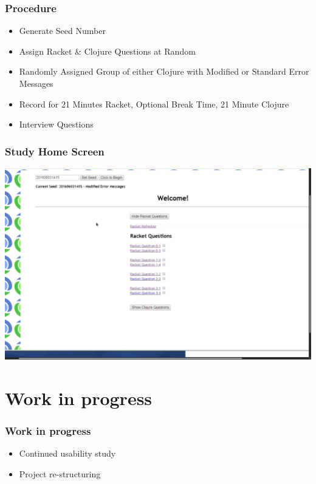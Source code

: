 \documentclass{beamer}
\begin{document}
\begin{frame}
  \frametitle{Procedure}
\begin{itemize}

\item Generate Seed Number
\item Assign Racket \& Clojure Questions at Random
\item Randomly Assigned Group of either Clojure with Modified or Standard Error Messages
\item Record for 21 Minutes Racket, Optional Break Time, 21 Minute Clojure
\item Interview Questions
  
\end{itemize}  
\end{frame}

\begin{frame}
  \frametitle{Study Home Screen}
  \includegraphics[scale=.17]{StudyHomeScreen}
\end{frame}




\section{Work in progress}

\begin{frame}
  \frametitle{Work in progress}
\begin{itemize}
\item Continued usability study 
\item Project re-structuring
\end{itemize}
\end{frame}
\end{document}
